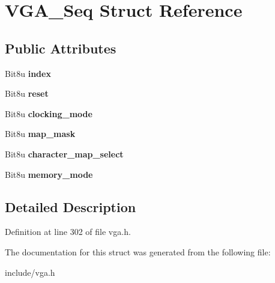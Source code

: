 \hypertarget{structVGA__Seq}{\section{V\-G\-A\-\_\-\-Seq Struct Reference}
\label{structVGA__Seq}
}
\subsection*{Public Attributes}
\begin{DoxyCompactItemize}
\item 
\hypertarget{structVGA__Seq_a00643c92e5873dcf83d17a3135b2d693}{Bit8u {\bfseries index}}\label{structVGA__Seq_a00643c92e5873dcf83d17a3135b2d693}

\item 
\hypertarget{structVGA__Seq_a3425fe4beaea31df04abd4a6b4dc34ce}{Bit8u {\bfseries reset}}\label{structVGA__Seq_a3425fe4beaea31df04abd4a6b4dc34ce}

\item 
\hypertarget{structVGA__Seq_a86024bda4c152b6e0bee83581155233e}{Bit8u {\bfseries clocking\-\_\-mode}}\label{structVGA__Seq_a86024bda4c152b6e0bee83581155233e}

\item 
\hypertarget{structVGA__Seq_a318a641c4a0ca18dd7de0de41e475bdc}{Bit8u {\bfseries map\-\_\-mask}}\label{structVGA__Seq_a318a641c4a0ca18dd7de0de41e475bdc}

\item 
\hypertarget{structVGA__Seq_a259ad5c028390b8e3f2247913c493044}{Bit8u {\bfseries character\-\_\-map\-\_\-select}}\label{structVGA__Seq_a259ad5c028390b8e3f2247913c493044}

\item 
\hypertarget{structVGA__Seq_a73f957b3431c728ff5908dfb58ed1e75}{Bit8u {\bfseries memory\-\_\-mode}}\label{structVGA__Seq_a73f957b3431c728ff5908dfb58ed1e75}

\end{DoxyCompactItemize}


\subsection{Detailed Description}


Definition at line 302 of file vga.\-h.



The documentation for this struct was generated from the following file\-:\begin{DoxyCompactItemize}
\item 
include/vga.\-h\end{DoxyCompactItemize}
